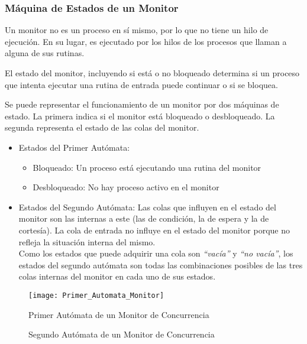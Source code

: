 \subsubsection{Máquina de Estados de un Monitor}
Un monitor no es un proceso en sí mismo, por lo que no tiene un hilo de
ejecución. En su lugar, es ejecutado por los hilos de los procesos que llaman a
alguna de sus rutinas.

El estado del monitor, incluyendo si está o no bloqueado determina si un
proceso que intenta ejecutar una rutina de entrada puede continuar o si se bloquea.

Se puede representar el funcionamiento de un monitor por dos máquinas de
estado. La primera indica si el monitor está bloqueado o desbloqueado. La
segunda representa el estado de las colas del monitor.
\begin{itemize}
    \item Estados del Primer Autómata:
    \begin{itemize}
        \item Bloqueado: Un proceso está ejecutando una rutina del monitor
        \item Desbloqueado: No hay proceso activo en el monitor
    \end{itemize}
    \item Estados del Segundo Autómata: Las colas que influyen en el estado del
    monitor son las internas a este (las de condición, la de espera y la de
    cortesía). La cola de entrada no influye en el estado del monitor porque no
    refleja la situación interna del mismo.\\
    Como los estados que puede adquirir una cola son \textit{“vacía”} y
    \textit{“no vacía”}, los estados del segundo autómata son todas las
    combinaciones posibles de las tres colas internas del monitor en cada uno de
    sus estados.
\end{itemize}

\begin{figure}[H]
  \centering
  \texttt{[image: Primer\_Automata\_Monitor]}
  \caption{Primer Autómata de un Monitor de Concurrencia}
  \label{fig:automata_monitor01}
\end{figure}

\begin{figure}[H]
  \centering
  \caption{Segundo Autómata de un Monitor de Concurrencia}
  \label{fig:automata_monitor02}
\end{figure}

